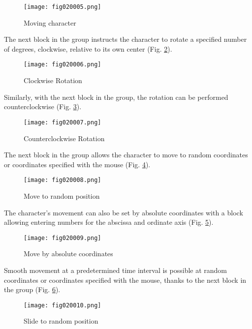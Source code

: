 \begin{figure}[H]
   \centering
   \texttt{[image: fig020005.png]}
   \caption{Moving character}
\label{fig020005}
\end{figure}

The next block in the group instructs the character to rotate a specified number of degrees, clockwise, relative to its own center (Fig. \ref{fig020006}).

\begin{figure}[H]
   \centering
   \texttt{[image: fig020006.png]}
   \caption{Clockwise Rotation}
\label{fig020006}
\end{figure}

Similarly, with the next block in the group, the rotation can be performed counterclockwise (Fig. \ref{fig020007}).

\begin{figure}[H]
   \centering
   \texttt{[image: fig020007.png]}
   \caption{Counterclockwise Rotation}
\label{fig020007}
\end{figure}

The next block in the group allows the character to move to random coordinates or coordinates specified with the mouse (Fig. \ref{fig020008}).

\begin{figure}[H]
   \centering
   \texttt{[image: fig020008.png]}
   \caption{Move to random position}
\label{fig020008}
\end{figure}

The character's movement can also be set by absolute coordinates with a block allowing entering numbers for the abscissa and ordinate axis (Fig. \ref{fig020009}).

\begin{figure}[H]
   \centering
   \texttt{[image: fig020009.png]}
   \caption{Move by absolute coordinates}
\label{fig020009}
\end{figure}

Smooth movement at a predetermined time interval is possible at random coordinates or coordinates specified with the mouse, thanks to the next block in the group (Fig. \ref{fig020010}).

\begin{figure}[H]
   \centering
   \texttt{[image: fig020010.png]}
   \caption{Slide to random position}
\label{fig020010}
\end{figure}

